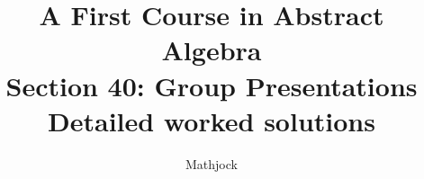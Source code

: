 
\title{\textbf{A First Course in Abstract Algebra}\\[0.3em]Section 40: Group Presentations\\[0.3em]\large Detailed worked solutions}
\author{Mathjock}
\date{}

\maketitle
\bookinfo
\tableofcontents
\clearpage
\renewcommand{\thesection}{40}
\renewcommand{\theHsection}{fraleigh.40}



